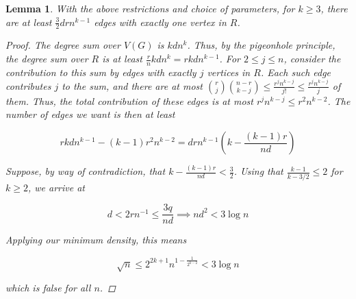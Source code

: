 \documentclass[12pt]{article}
\newtheorem{lemma}[thm]{Lemma}
\begin{document}
    \begin{lemma}
        With the above restrictions and choice of parameters, \color{red} for $k \geq 3$, \color{black}
        there are at least $\frac{3}{2}drn^{k-1}$
        edges with exactly one vertex in $R$.

        \begin{proof}

            The degree sum over $V(G)$ is $kdn^{k}$.
            Thus, by the pigeonhole principle, the degree sum over $R$ is at least
            $\frac{r}{n}kdn^{k} = rkdn^{k-1}$.
            For $2 \leq j \leq n$, consider the contribution to this sum by edges with exactly $j$ vertices in $R$.
            Each such edge contributes $j$ to the sum, and there are at most
            $\binom{r}{j}\binom{n-r}{k-j} \leq \frac{r^j n^{k-j}}{j!} \leq \frac{r^j n^{k-j}}{j}$ of them.
            Thus, the total contribution of these edges is at most $r^j n^{k-j} \leq r^{2}n^{k-2}$.
            The number of edges we want is then at least

            \[
                rkdn^{k-1} - (k-1)r^{2}n^{k-2} = drn^{k-1} \left( k - \frac{(k-1)r}{nd}\right)
            \]
            
            Suppose, by way of contradiction,
            that $ k - \frac{(k-1)r}{nd} < \frac{3}{2}$.
            Using that $\frac{k-1}{k-3/2} \leq 2$
            for $k \geq 2$, we arrive at

            \[
                d < 2rn^{-1} \leq \frac{3q}{nd} \implies nd^2 < 3 \log n
            \]
            
            Applying our minimum density, this means
            
            \[
                \sqrt {n} \leq 2^{2k+1} n^{1 - \frac{1}{2^{k-2}}} < 3 \log n
            \]

            which is false for all $n$.
        \end{proof}
    \end{lemma}
\end{document}
